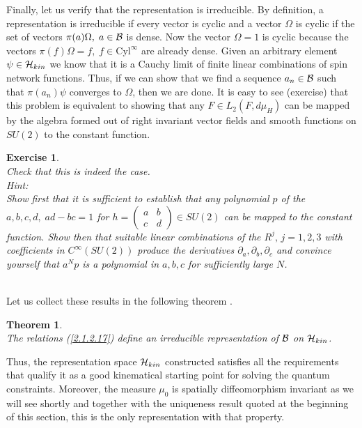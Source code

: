 \documentclass[12pt]{report}
\newtheorem{Theorem}{Theorem}[section]
\newtheorem{Exercise}{Exercise}[section]
\begin{document}
Finally, let us verify that the representation is irreducible.
By definition, a representation is irreducible if every vector is cyclic
and a vector $\Omega$ is cyclic if the set of vectors $\pi(a)\Omega,\;
a\in {\cal B}$ is dense. Now the vector $\Omega=1$ is cyclic because 
the vectors $\pi(f)\Omega=f,\;f\in \mbox{Cyl}^\infty$ are already dense.
Given an arbitrary element $\psi\in {\cal H}_{kin}$ we know that it is a 
Cauchy limit of finite linear combinations of spin network functions.
Thus, if we can show that we find a sequence $a_n\in {\cal B}$ such 
that $\pi(a_n)\psi$ converges to $\Omega$, then we are done. It is easy to 
see (exercise) that this problem is equivalent to showing that any $F\in 
L_2(F,d\mu_H)$ can be mapped by the algebra formed out of right 
invariant vector fields and smooth functions on $SU(2)$ to the constant 
function.  
%
\begin{Exercise} \label{ex2.1.2.6} ~~~~\\
Check that this is indeed the case.\\
Hint:\\
Show first that it is sufficient to establish that any polynomial
$p$ of the $a,b,c,d,\;ad-bc=1$ for 
$h=\left( \begin{array}{cc} a & b\\ c & d \end{array} \right)\in SU(2)$
can be mapped to the constant function. Show then that suitable linear
combinations of the $R^j,\,j=1,2,3$ with coefficients in $C^\infty(SU(2))$
produce the derivatives $\partial_a,\partial_b,\partial_c$ and convince 
yourself that $a^N p$ is a polynomial in $a,b,c$ for sufficiently large 
$N$.
\end{Exercise}
%
~\\
Let us collect these results in the following theorem \cite{36a}.
%
\begin{Theorem}
\label{th2.1.2.3} ~~~~~~\\
The relations (\ref{2.1.2.17}) define an irreducible representation of 
$\cal B$ on ${\cal H}_{kin}$.
\end{Theorem}
%
Thus, the representation space ${\cal H}_{kin}$ constructed 
satisfies all the requirements that qualify it as a good kinematical
starting point for solving the quantum constraints. Moreover, the 
measure $\mu_0$ is spatially diffeomorphism invariant as we will see 
shortly and together with the uniqueness result quoted at the beginning
of this section, this is the only representation with that property.
\end{document}
